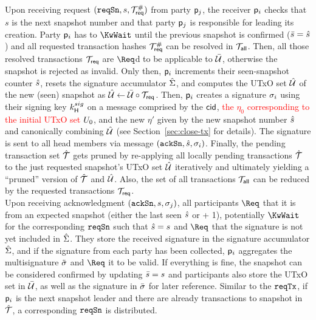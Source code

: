 \quad Upon receiving request
$(\mathtt{reqSn},s,{\mathcal T}_{\mathsf{req}}^{\#})$ from party $\mathsf p_j$, the receiver
$\mathsf p_i$ checks that $s$ is the next snapshot number and that party
$\mathsf p_j$ is responsible for leading its creation. Party
$\mathsf p_i$ has to $\KwWait$ until the previous snapshot is confirmed ($\bar s =
\hat s$) and all requested transaction hashes ${\mathcal T}_{\mathsf{req}}^{\#}$ can be
resolved in ${\mathcal T}_{\mathsf{all}}$.  Then, all those resolved transactions ${\mathcal T}_{\mathsf{req}}$ are $\Req$d
to be applicable to $\bar {\mathcal U}$, otherwise the snapshot is rejected as invalid.
Only then, $\mathsf p_i$ increments their seen-snapshot counter $\hat s$, resets
the signature accumulator $\hat{\Sigma}$, and computes the UTxO set $\hat {\mathcal U}$ of
the new (seen) snapshot as $\hat {\mathcal U} \gets \bar {\mathcal U} \circ {\mathcal T}_{\mathsf{req}}$.
Then, $\mathsf p_i$ creates a signature $\sigma_i$ using their signing key
$k^{sig}_\mathsf{H}$ on a message comprised by the $\mathsf{cid}$, \textcolor{red}{the
$\eta_{0}$ corresponding to the initial UTxO set $U_{0}$}, and the new $\eta'$
given by the new snapshot number $\hat s$ and canonically combining $\hat {\mathcal U}$
(see Section~\ref{sec:close-tx} for details). The signature is sent to all head
members via message $(\mathtt{ackSn},\hat s,\sigma_i)$. Finally, the pending transaction
set $\hat {\mathcal T}$ gets pruned by re-applying all locally pending transactions
$\hat {\mathcal T}$ to the just requested snapshot's UTxO set $\hat {\mathcal U}$ iteratively and
ultimately yielding a ``pruned'' version of $\hat {\mathcal T}$ and $\hat {\mathcal U}$. Also, the
set of all transactions ${\mathcal T}_{\mathsf{all}}$ can be reduced by the requested
transactions ${\mathcal T}_{\mathsf{req}}$.\\

\quad Upon receiving acknowledgment $(\mathtt{ackSn},s,\sigma_j)$, all
participants $\Req$ that it is from an expected snapshot (either the last seen
$\hat s$ or + 1), potentially $\KwWait$ for the corresponding $\mathtt{reqSn}$ such that
$\hat s = s$ and $\Req$ that the signature is not yet included in $\hat{\Sigma}$.
They store the received signature in the signature accumulator $\hat{\Sigma}$, and
if the signature from each party has been collected, $\mathsf p_i$ aggregates the
multisignature $\tilde\sigma$ and $\Req$ it to be valid. If everything is fine, the
snapshot can be considered confirmed by updating $\bar s=s$ and participants also
store the UTxO set in $\bar {\mathcal U}$, as well as the signature in $\bar{\sigma}$ for
later reference. Similar to the $\mathtt{reqTx}$, if $\mathsf p_i$ is the next snapshot
leader and there are already transactions to snapshot in $\hat {\mathcal T}$, a
corresponding $\mathtt{reqSn}$ is distributed.

